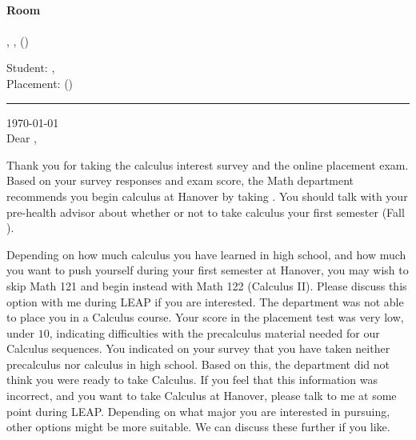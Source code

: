 \documentclass[12pt]{article}
\begin{document}
	\newpage
	{\ }
		\vfill
	\begin{center}
	{\Huge
	\textbf{Room\\
	\vspace{0.5in}
	}
	}\\
	\vfill
		, ,  ()\\
	\end{center}
	\vfill
		\newpage
		{\Large Student: , \\
		Placement:  ()
		}
		\vspace{0.2in}
		\hrule
		\vspace{0.6in}
		\noindent\today\\

		\vspace{0.2in}
		\noindent Dear ,
		\vspace{0.2in}

		Thank you for taking the calculus interest survey and the online placement exam.
    		 Based on your survey responses and exam score, the Math department recommends you begin calculus at Hanover by taking .  
    			You should talk with your pre-health advisor about whether or not to take calculus your first semester (Fall \the\year).
		
    		Depending on how much calculus you have learned in high school, and how much you want to push yourself during your first semester at Hanover, you may wish to skip Math 121 and begin instead with Math 122 (Calculus II).  Please discuss this option with me during LEAP if you are interested.
    	The department was not able to place you in a Calculus course.
    	Your score in the placement test was very low, under \( 10 \), indicating difficulties with the precalculus material needed for our Calculus sequences.
        You indicated on your survey that you have taken neither precalculus nor calculus in high school.
	    Based on this, the department did not think you were ready to take Calculus. If you feel that this information was incorrect, and you want to take Calculus at Hanover, please talk to me at some point during LEAP. Depending on what major you are interested in pursuing, other options might be more suitable. We can discuss these further if you like.
    	
\end{document}
